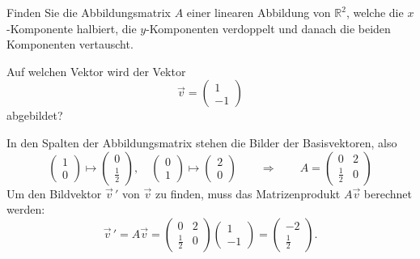 Finden Sie die Abbildungsmatrix $A$ einer linearen Abbildung von $\mathbb R^2$,
welche die $x$-Komponente halbiert, die $y$-Komponenten verdoppelt und
danach die beiden Komponenten vertauscht.

Auf welchen Vektor wird der Vektor
\[
\vec v = \begin{pmatrix}1\\-1\end{pmatrix}
\]
abgebildet?


\begin{loesung}
In den Spalten der Abbildungsmatrix stehen die Bilder der Basisvektoren, also
\[
\begin{pmatrix}1\\0\end{pmatrix}\mapsto\begin{pmatrix}0\\\frac12\end{pmatrix}
,\quad
\begin{pmatrix}0\\1\end{pmatrix}\mapsto\begin{pmatrix}2\\0\end{pmatrix}
\qquad
\Rightarrow\qquad
A=\begin{pmatrix}
0&2\\
\frac12&0
\end{pmatrix}
\]
Um den Bildvektor $\vec v\,'$ von $\vec v$ zu finden, muss das Matrizenprodukt $A\vec v$ berechnet werden:
\[
  \vec v\,' = A \vec v = \begin{pmatrix}
0&2\\
\frac12&0
\end{pmatrix}
\begin{pmatrix}1\\-1\end{pmatrix}
= \begin{pmatrix}-2\\\frac{1}{2}\end{pmatrix}.
\]
\end{loesung}

